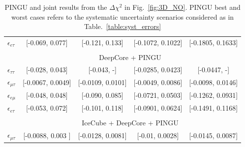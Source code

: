 \documentclass[draft=True]{revtex4-2}
\newcommand{\emt}{\ensuremath{\epsilon_{\mu\tau}}}
\newcommand{\eet}{\epsilon_{e\tau}}
\newcommand{\eem}{\epsilon_{e\mu}}
\newcommand{\ett}{\ensuremath{\epsilon_{\tau\tau}}}
\begin{document}
{{\begin{table}
\begin{tabular}{lcccc}
      $\eet$ & [-0.069, 0.077] & [-0.121, 0.133] & [-0.1072, 0.1022] & [-0.1805, 0.1633]\\\\
      & \multicolumn{4}{c}{DeepCore + PINGU} \\
      $\ett$ & [-0.028, 0.043] & [-0.043, -] & [-0.0285,  0.0423] & [-0.0447, -]\\
      $\emt$ & [-0.0067, 0.0049] & [-0.0109,  0.0101] & [-0.0049, 0.0086] & [-0.0098, 0.0146]\\
      $\eem$ & [-0.048, 0.048]  & [-0.090, 0.085] & [-0.0721, 0.0503] & [-0.1262, 0.0931]\\
      $\eet$ & [-0.053, 0.072]  & [-0.101, 0.118] & [-0.0901, 0.0624] & [-0.1491, 0.1168]\\\\
      & \multicolumn{4}{c}{IceCube + DeepCore + PINGU}  \\
      $\emt$ & [-0.0088,  0.003 ] & [-0.0128, 0.0081] & [-0.01, 0.0028] & [-0.0145, 0.0087]\\
      \hline
      \hline
   \end{tabular}
   \caption{PINGU and joint results from the $\Delta \chi^2$ in Fig.~\ref{fig:3D_NO}. PINGU best and worst cases refers to 
   the systematic uncertainty scenarios considered as in Table.~\ref{table:syst_errors}}\label{table:PINGU_joint_results}
\end{table}

}}
\end{document}
